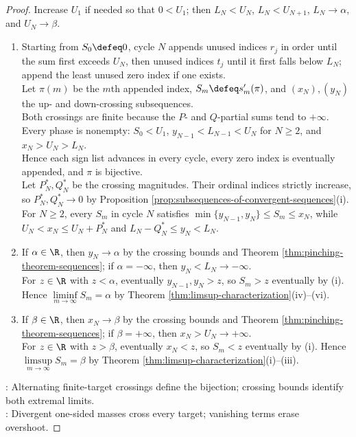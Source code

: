 \begin{theorem}
\begin{proof}
Increase $U_1$ if needed so that $0<U_1$; then $L_N<U_N$, $L_N<U_{N+1}$, $L_N\to\alpha$, and $U_N\to\beta$.
\begin{enumerate}[label=(\roman*)]
\setlength{\itemsep}{0pt}
\item Starting from $S_0\defeq0$, cycle $N$ appends unused indices $r_j$ in order until the sum first exceeds $U_N$, then unused indices $t_j$ until it first falls below $L_N$; append the least unused zero index if one exists.\\
Let $\pi(m)$ be the $m$th appended index, $S_m\defeq s'_m(\pi)$, and $(x_N),(y_N)$ the up- and down-crossing subsequences.\\
Both crossings are finite because the $P$- and $Q$-partial sums tend to $+\infty$.\\
Every phase is nonempty: $S_0<U_1$, $y_{N-1}<L_{N-1}<U_N$ for $N\geq2$, and $x_N>U_N>L_N$.\\
Hence each sign list advances in every cycle, every zero index is eventually appended, and $\pi$ is bijective.\\
Let $P_N^*,Q_N^*$ be the crossing magnitudes. Their ordinal indices strictly increase, so $P_N^*,Q_N^*\to0$ by Proposition \ref{prop:subsequences-of-convergent-sequences}(i).\\
For $N\geq2$, every $S_m$ in cycle $N$ satisfies $\min\{y_{N-1},y_N\}\leq S_m\leq x_N$, while $U_N<x_N\leq U_N+P_N^*$ and $L_N-Q_N^*\leq y_N<L_N$.
\item If $\alpha\in\R$, then $y_N\to\alpha$ by the crossing bounds and Theorem \ref{thm:pinching-theorem-sequences}; if $\alpha=-\infty$, then $y_N<L_N\to-\infty$.\\
For $z\in\R$ with $z<\alpha$, eventually $y_{N-1},y_N>z$, so $S_m>z$ eventually by (i). Hence $\liminf\limits_{m\to\infty}S_m=\alpha$ by Theorem \ref{thm:limsup-characterization}(iv)--(vi).
\item If $\beta\in\R$, then $x_N\to\beta$ by the crossing bounds and Theorem \ref{thm:pinching-theorem-sequences}; if $\beta=+\infty$, then $x_N>U_N\to+\infty$.\\
For $z\in\R$ with $z>\beta$, eventually $x_N<z$, so $S_m<z$ eventually by (i). Hence $\limsup\limits_{m\to\infty}S_m=\beta$ by Theorem \ref{thm:limsup-characterization}(i)--(iii).
\end{enumerate}
: Alternating finite-target crossings define the bijection; crossing bounds identify both extremal limits.\\
: Divergent one-sided masses cross every target; vanishing terms erase overshoot.
\end{proof}
\end{theorem}

